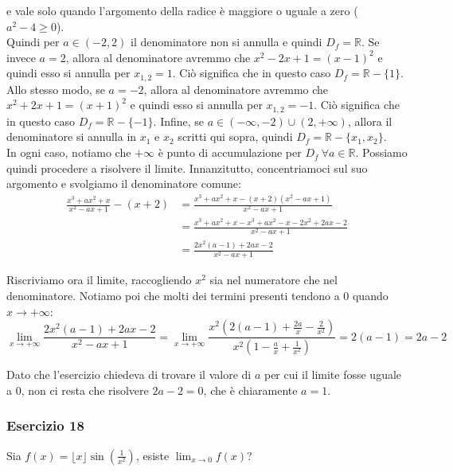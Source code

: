 \documentclass{article}
\begin{document}
\noindent e vale solo quando l'argomento della radice è maggiore o uguale a zero ($a^2 - 4 \geq 0$). \\
Quindi per $a \in (-2, 2)$ il denominatore non si annulla e quindi $D_f = \mathbb{R}$. Se invece $a = 2$, allora al denominatore avremmo che $x^2 - 2x + 1 = (x - 1)^2$ e quindi esso si annulla per $x_{1, 2} = 1$. Ciò significa che in questo caso $D_f = \mathbb{R} - \{1\}$. Allo stesso modo, se $a = -2$, allora al denominatore avremmo che $x^2 + 2x + 1 = (x + 1)^2$ e quindi esso si annulla per $x_{1, 2} = -1$. Ciò significa che in questo caso $D_f = \mathbb{R} - \{-1\}$. Infine, se $a \in (-\infty, -2) \cup (2, +\infty)$, allora il denominatore si annulla in $x_1$ e $x_2$ scritti qui sopra, quindi $D_f = \mathbb{R} - \{x_1, x_2\}$.\\
In ogni caso, notiamo che $+\infty$ è punto di accumulazione per $D_f \ \forall a \in \mathbb{R}$. Possiamo quindi procedere a risolvere il limite. Innanzitutto, concentriamoci sul suo argomento e svolgiamo il denominatore comune:
\begin{align*}
    \frac{x^3 + ax^2 + x}{x^2 - ax + 1} - (x + 2) &= \frac{x^3 + ax^2 + x - (x + 2)(x^2 - ax + 1)}{x^2 - ax + 1} \\
    &= \frac{x^3 + ax^2 + x - x^3 + ax^2 - x - 2x^2 + 2ax - 2}{x^2 - ax + 1} \\
    &= \frac{2x^2(a - 1) + 2ax - 2}{x^2 - ax + 1}
\end{align*}

\noindent Riscriviamo ora il limite, raccogliendo $x^2$ sia nel numeratore che nel denominatore. Notiamo poi che molti dei termini presenti tendono a $0$ quando $x \to +\infty$:
\begin{equation*}
    \lim_{x \to +\infty} \frac{2x^2(a - 1) + 2ax - 2}{x^2 - ax + 1} = \lim_{x \to +\infty} \frac{x^2\left(2(a - 1) + \frac{2a}{x} - \frac{2}{x^2}\right)}{x^2\left(1 - \frac{a}{x} + \frac{1}{x^2}\right)} = 2(a - 1) = 2a - 2
\end{equation*}

\noindent Dato che l'esercizio chiedeva di trovare il valore di $a$ per cui il limite fosse uguale a $0$, non ci resta che risolvere $2a - 2 = 0$, che è chiaramente $a = 1$.

\subsubsection{Esercizio 18}
Sia $f(x) = \lfloor x \rfloor \sin(\frac{1}{x^2})$, esiste $\lim_{x \to 0} f(x)$?\\
\end{document}
